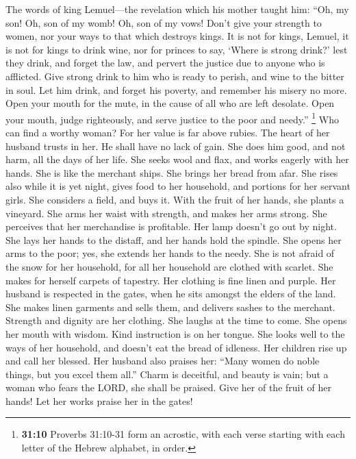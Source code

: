  The words of king Lemuel---the revelation which his
mother taught him:  ``Oh, my son! Oh, son of my womb! Oh,
son of my vows!  Don't give your strength to women, nor
your ways to that which destroys kings.  It is not for
kings, Lemuel, it is not for kings to drink wine, nor for princes to
say, `Where is strong drink?'  lest they drink, and forget
the law, and pervert the justice due to anyone who is afflicted.
 Give strong drink to him who is ready to perish, and wine
to the bitter in soul.  Let him drink, and forget his
poverty, and remember his misery no more.  Open your mouth
for the mute, in the cause of all who are left desolate. 
Open your mouth, judge righteously, and serve justice to the poor and
needy.''  \footnote{\textbf{31:10} Proverbs 31:10-31 form
  an acrostic, with each verse starting with each letter of the Hebrew
  alphabet, in order.} Who can find a worthy woman? For her value is far
above rubies.  The heart of her husband trusts in her. He
shall have no lack of gain.  She does him good, and not
harm, all the days of her life.  She seeks wool and flax,
and works eagerly with her hands.  She is like the
merchant ships. She brings her bread from afar.  She
rises also while it is yet night, gives food to her household, and
portions for her servant girls.  She considers a field,
and buys it. With the fruit of her hands, she plants a vineyard.
 She arms her waist with strength, and makes her arms
strong.  She perceives that her merchandise is
profitable. Her lamp doesn't go out by night.  She lays
her hands to the distaff, and her hands hold the spindle.
 She opens her arms to the poor; yes, she extends her
hands to the needy.  She is not afraid of the snow for
her household, for all her household are clothed with scarlet.
 She makes for herself carpets of tapestry. Her clothing
is fine linen and purple.  Her husband is respected in
the gates, when he sits amongst the elders of the land. 
She makes linen garments and sells them, and delivers sashes to the
merchant.  Strength and dignity are her clothing. She
laughs at the time to come.  She opens her mouth with
wisdom. Kind instruction is on her tongue.  She looks
well to the ways of her household, and doesn't eat the bread of
idleness.  Her children rise up and call her blessed. Her
husband also praises her:  ``Many women do noble things,
but you excel them all.''  Charm is deceitful, and beauty
is vain; but a woman who fears the LORD, she shall be praised.
 Give her of the fruit of her hands! Let her works praise
her in the gates!
